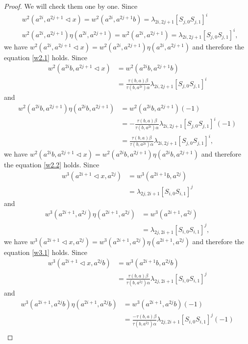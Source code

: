 \documentclass[a4paper,11pt]{amsart}
\numberwithin{equation}{section}
\begin{document}
\begin{proof}
We will check them one by one. Since
\begin{align*}
&w^2(a^{2i},a^{2j+1}\triangleleft x)=
w^2(a^{2i},a^{2j+1}b)
=\lambda_{2i,2j+1}[S_{j,0}S_{j,1}]^{i}\\
&w^2(a^{2i},a^{2j+1})\eta(a^{2i},a^{2j+1})=w^2(a^{2i},a^{2j+1})
=\lambda_{2i,2j+1}[S_{j,0}S_{j,1}]^{i},
\end{align*}
we have $w^2(a^{2i},a^{2j+1}\triangleleft x)=w^2(a^{2i},a^{2j+1})\eta(a^{2i},a^{2j+1})$ and therefore the equation \eqref{w2.1} holds.  Since
\begin{align*}
w^2(a^{2i}b,a^{2j+1}\triangleleft x)&=
w^2(a^{2i}b,a^{2j+1}b)\\
&=\frac{\tau(b,a)\beta}{\tau(b,a^{2i})\alpha}\lambda_{2i,2j+1}[S_{j,0}S_{j,1}]^{i}
\end{align*}
and
\begin{align*}
w^2(a^{2i}b,a^{2j+1})\eta(a^{2i}b,a^{2j+1})&=w^2(a^{2i}b,a^{2j+1})(-1)\\
&=-\frac{\tau(b,a)\beta}{\tau(b,a^{2i})\alpha}\lambda_{2i,2j+1}[S_{j,0}S_{j,1}]^{i}(-1)\\
&=\frac{\tau(b,a)\beta}{\tau(b,a^{2i})\alpha}\lambda_{2i,2j+1}[S_{j,0}S_{j,1}]^{i},
\end{align*}
we have $w^2(a^{2i}b,a^{2j+1}\triangleleft x)=w^2(a^{2i}b,a^{2j+1})\eta(a^{2i}b,a^{2j+1})$ and therefore the equation \eqref{w2.2} holds. Since
\begin{align*}
w^3(a^{2i+1}\triangleleft x,a^{2j})&=
w^3(a^{2i+1}b,a^{2j})\\
&=\lambda_{2j,2i+1}[S_{i,0}S_{i,1}]^{j}
\end{align*}
and
\begin{align*}
w^3(a^{2i+1},a^{2j})\eta(a^{2i+1},a^{2j})&=w^3(a^{2i+1},a^{2j})\\
&=\lambda_{2j,2i+1}[S_{i,0}S_{i,1}]^{j},
\end{align*}
we have $w^3(a^{2i+1}\triangleleft x,a^{2j})=w^3(a^{2i+1},a^{2j})\eta(a^{2i+1},a^{2j})$ and therefore the equation \eqref{w3.1} holds. Since
\begin{align*}
w^3(a^{2i+1}\triangleleft x,a^{2j}b)&=
w^3(a^{2i+1}b,a^{2j}b)\\
&=\frac{\tau(b,a)\beta}{\tau(b,a^{2j})\alpha} \lambda_{2j,2i+1}[S_{i,0}S_{i,1}]^{j}
\end{align*}
and
\begin{align*}
w^3(a^{2i+1},a^{2j}b)\eta(a^{2i+1},a^{2j}b)&=w^3(a^{2i+1},a^{2j}b) (-1)\\
&=\frac{-\tau(b,a)\beta}{\tau(b,a^{2j})\alpha} \lambda_{2j,2i+1}[S_{i,0}S_{i,1}]^{j} (-1)\\

\end{align*}
\end{proof}
\end{document}

